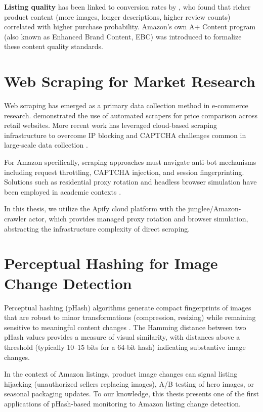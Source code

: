 \textbf{Listing quality} has been linked to conversion rates by \cite{ghose2009},
who found that richer product content (more images, longer descriptions, higher review
counts) correlated with higher purchase probability. Amazon's own A+ Content program
(also known as Enhanced Brand Content, EBC) was introduced to formalize these
content quality standards.

\section{Web Scraping for Market Research}

Web scraping has emerged as a primary data collection method in e-commerce research.
\cite{lewis2011} demonstrated the use of automated scrapers for price comparison
across retail websites. More recent work has leveraged cloud-based scraping
infrastructure to overcome IP blocking and CAPTCHA challenges common in large-scale
data collection \cite{mitchell2018webscraping}.

For Amazon specifically, scraping approaches must navigate anti-bot mechanisms including
request throttling, CAPTCHA injection, and session fingerprinting. Solutions such as
residential proxy rotation and headless browser simulation have been employed in
academic contexts \cite{richardson2019scrapy}.

In this thesis, we utilize the Apify cloud platform with the junglee/Amazon-crawler
actor, which provides managed proxy rotation and browser simulation, abstracting the
infrastructure complexity of direct scraping.

\section{Perceptual Hashing for Image Change Detection}

Perceptual hashing (pHash) algorithms generate compact fingerprints of images that
are robust to minor transformations (compression, resizing) while remaining sensitive
to meaningful content changes \cite{zauner2010phash}. The Hamming distance between
two pHash values provides a measure of visual similarity, with distances above a
threshold (typically 10–15 bits for a 64-bit hash) indicating substantive image
changes.

In the context of Amazon listings, product image changes can signal listing hijacking
(unauthorized sellers replacing images), A/B testing of hero images, or seasonal
packaging updates. To our knowledge, this thesis presents one of the first applications
of pHash-based monitoring to Amazon listing change detection.


